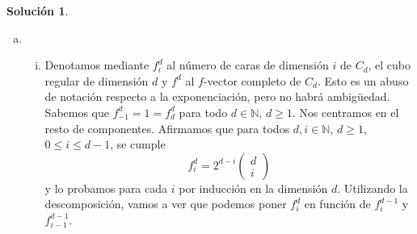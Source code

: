 \documentclass[10pt]{article}
\theoremstyle{definition}
\newtheorem*{sol}{Solución}
\begin{document}
\begin{sol}\leavevmode
\begin{enumerate}[(a)]
\item
\begin{enumerate}[i.]
\item Denotamos mediante $f_i^d$ al número de caras de dimensión $i$ de $C_d$, el cubo regular de dimensión $d$ y $f^d$ al $f$-vector completo de $C_d$. Esto es un abuso de notación respecto a la exponenciación, pero no habrá ambigüedad. Sabemos que $f_{-1}^d=1=f_d^d$ para todo $d\in\mathbb{N}$, $d\geq 1$. Nos centramos en el resto de componentes. Afirmamos que para todos $d,i\in\mathbb{N}$, $d\geq 1$, $0\leq i\leq d-1$, se cumple
\[f_i^d=2^{d-i}\begin{pmatrix}d\\i\end{pmatrix}\]
y lo probamos para cada $i$ por inducción en la dimensión $d$. Utilizando la descomposición, vamos a ver que podemos poner $f_i^d$ en función de $f_i^{d-1}$ y $f_{i-1}^{d-1}$.




\end{enumerate}
\end{enumerate}
\end{sol}
\end{document}
